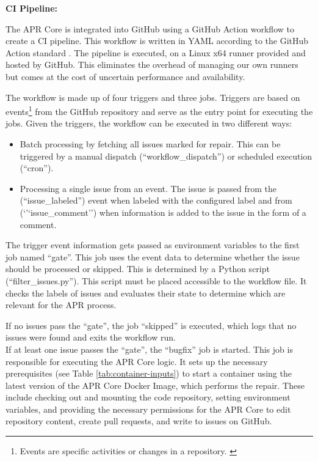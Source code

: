 \textbf{\ac{CI} Pipeline:}

The APR Core is integrated into GitHub using a GitHub Action workflow to create a \ac{CI} pipeline. This workflow is written in YAML according to the GitHub Action standard \cite{WorkflowSyntaxGitHub}. The pipeline is executed, on a Linux x64 runner provided and hosted by GitHub. This eliminates the overhead of managing our own runners but comes at the cost of uncertain performance and availability.

The workflow is made up of four triggers and three jobs. Triggers are based on events\footnote{Events are specific activities or changes in a repository. \cite{GitHubEventTypes}} from the GitHub repository and serve as the entry point for executing the jobs. Given the triggers, the workflow can be executed in two different ways:

\begin{itemize}
    \item Batch processing by fetching all issues marked for repair. This can be triggered by a manual dispatch (``workflow\_dispatch'') or scheduled execution (``cron'').
    \item Processing a single issue from an event. The issue is passed from the (``issue\_labeled'') event when labeled with the configured label and from (`'`issue\_comment'') when information is added to the issue in the form of a comment.
\end{itemize}

The trigger event information gets passed as environment variables to the first job named ``gate''. This job uses the event data to determine whether the issue should be processed or skipped. This is determined by a Python script (``filter\_issues.py''). This script must be placed accessible to the workflow file. It checks the labels of issues and evaluates their state to determine which are relevant for the APR process.

If no issues pass the ``gate'', the job ``skipped'' is executed, which logs that no issues were found and exits the workflow run.\\
If at least one issue passes the ``gate'', the ``bugfix'' job is started. This job is responsible for executing the APR Core logic. It sets up the necessary prerequisites (see Table \ref{tab:container-inputs}) to start a container using the latest version of the APR Core Docker Image, which performs the repair. These include checking out and mounting the code repository, setting environment variables, and providing the necessary permissions for the APR Core to edit repository content, create pull requests, and write to issues on GitHub.

